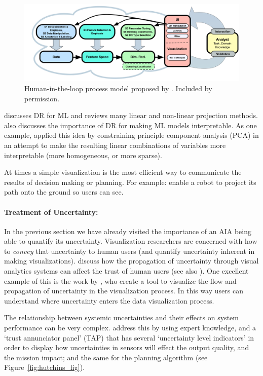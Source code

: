 \begin{figure}[htpb]
    \centering
    \includegraphics[width=0.8\linewidth]{Figures/dimred_framework.png}
    \caption{Human-in-the-loop process model proposed by \cite{Sacha2017-hf}. Included by permission.}
    \label{fig:sacha_fig}
\end{figure}

\citet{Venna2007-yj} discusses DR for ML and reviews many linear and non-linear projection methods. \citet{Vellido2012-nm} also discusses the importance of DR for making ML models interpretable. As one example, \citet{Chipman2005-om} applied this idea by constraining principle component analysis (PCA) in an attempt to make the resulting linear combinations of variables more interpretable (more homogeneous, or more sparse).

At times a simple visualization is the most efficient way to communicate the results of decision making or planning. For example: \citet{Chadalavada2015-wx} enable a robot to project its path onto the ground so users can see.

\paragraph{Treatment of Uncertainty:}
In the previous section we have already visited the importance of an AIA being able to quantify its uncertainty. Visualization researchers are concerned with how to \emph{convey} that uncertainty to human users (and quantify uncertainty inherent in making visualizations). \citet{Sacha2016-tu} discuss how the propagation of uncertainty through visual analytics systems can affect the trust of human users (see also \cite{Correa2009-hi}).
One excellent example of this is the work by \citet{Wu2012-qi}, who create a tool to visualize the flow and propagation of uncertainty in the visualization process. In this way users can understand where uncertainty enters the data visualization process.

The relationship between systemic uncertainties and their effects on system performance can be very complex. \citet{Hutchins2015-if} address this by using expert knowledge, and a `trust annunciator panel' (TAP) that has several `uncertainty level indicators' in order to display how uncertainties in sensors will effect the output quality, and the mission impact; and the same for the planning algorithm (see Figure~\ref{fig:hutchins_fig}).

